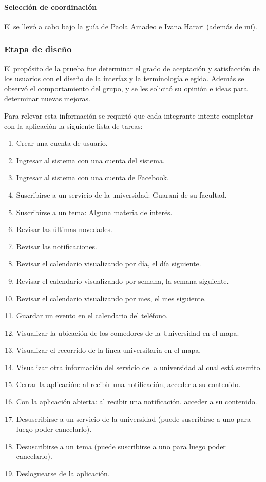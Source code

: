 \paragraph{Selección de coordinación}
\label{desarrollo_pruebas_usabilidad_preparativos_coordinacion}

El  se llevó a cabo bajo la guía de Paola Amadeo e Ivana Harari (además de mí).

\subsubsection{Etapa de diseño}
\label{desarrollo_pruebas_usabilidad_diseno}

El propósito de la prueba fue determinar el grado de aceptación y satisfacción de los usuarios con el diseño de la interfaz y la terminología elegida. Además se observó el comportamiento del grupo, y se les solicitó su opinión e ideas para determinar nuevas mejoras. 

Para relevar esta información se requirió que cada integrante intente completar con la aplicación la siguiente lista de tareas: 
\begin{enumerate}
\item Crear una cuenta de usuario.
\item Ingresar al sistema con una cuenta del sistema.
\item Ingresar al sistema con una cuenta de Facebook.
\item Suscribirse a un servicio de la universidad: Guaraní de su facultad.
\item Suscribirse a un tema: Alguna materia de interés.
\item Revisar las últimas novedades.
\item Revisar las notificaciones.
\item Revisar el calendario visualizando por día, el día siguiente.
\item Revisar el calendario visualizando por semana, la semana siguiente.
\item Revisar el calendario visualizando por mes, el mes siguiente.
\item Guardar un evento en el calendario del teléfono.
\item Visualizar la ubicación de los comedores de la Universidad en el mapa.
\item Visualizar el recorrido de la línea universitaria en el mapa.
\item Visualizar otra información del servicio de la universidad al cual está suscrito.
\item Cerrar la aplicación: al recibir una notificación, acceder a su contenido.
\item Con la aplicación abierta: al recibir una notificación, acceder a su contenido.
\item Desuscribirse a un servicio de la universidad (puede suscribirse a uno para luego poder cancelarlo).
\item Desuscribirse a un tema (puede suscribirse a uno para luego poder cancelarlo).
\item Desloguearse de la aplicación.
\end{enumerate}

